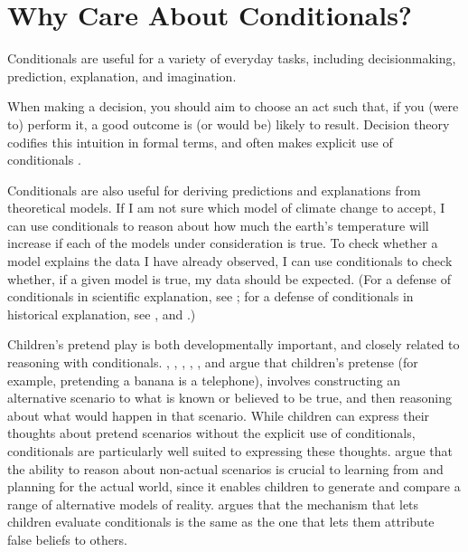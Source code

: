 \section{Why Care About Conditionals?}

Conditionals are useful for a variety of everyday tasks, including decisionmaking, prediction, explanation, and imagination.

When making a decision, you should aim to choose an act such that, if you (were to) perform it, a good outcome is (or would be) likely to result.  Decision theory codifies this intuition in formal terms, and often makes explicit use of conditionals   \citep{gibbard-harper, vinci-decision, bradley-conditionals, Cantwell2013-CANCIC}.

Conditionals are also useful for deriving predictions and explanations from theoretical models.  If I am not sure which model of climate change to accept, I can use conditionals to reason about how much the earth's temperature will increase if each of the models under consideration is true.  To check whether a model explains the data I have already observed, I can use conditionals to check whether, if a given model is true, my data should be expected.  (For a defense of conditionals in scientific explanation, see \citealp{Woodward2004-WOOCAC}; for a defense of conditionals in historical explanation, see \citealp{Reiss2009-REICTE}, and \citealp{Nolan2013-NOLWHA}.)

Children's pretend play is both developmentally important, and closely related to reasoning with conditionals.  \citet{amsel-smalley}, \citet{dias-harris}, \citet{gopnik-phil-baby}, \citet{harris-imagination}, \citet{lillard-pretend}, and \citet{walton-mimesis} argue that children's pretense (for example, pretending a banana is a telephone), involves constructing an alternative scenario to what is known or believed to be true, and then reasoning about what would happen in that scenario.  While children can express their thoughts about pretend scenarios without the explicit use of conditionals, conditionals are particularly well suited to expressing these thoughts.  \citet{weisberg-gopnik} argue that the ability to reason about non-actual scenarios is crucial to learning from and planning for the actual world, since it enables children to generate and compare a range of alternative models of reality.  \citet{kryzyzanowska} argues that the mechanism that lets children evaluate conditionals is the same as the one that lets them attribute false beliefs to others.

